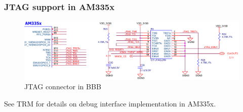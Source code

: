 \begin{frame}
  \frametitle{JTAG support in AM335x}
  \begin{figure}
    \centering
    \hspace*{-2mm}\includegraphics[scale=0.33]{images/jtag-bbb-scheme.pdf}\hspace*{-2mm}
    \caption{JTAG connector in BBB}
  \end{figure}
  See TRM for details on debug interface implementation in AM335x.
\end{frame}

